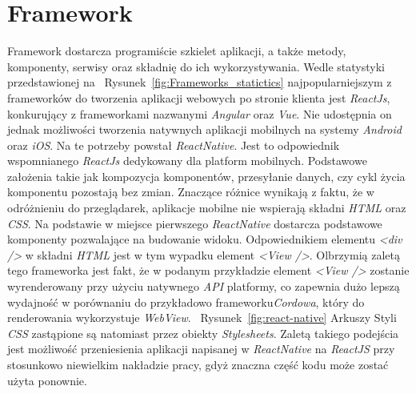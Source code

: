 \documentclass[skorowidz,skroty]{dyplomWEZUT}
\begin{document}
\section{Framework}\label{sec: framework}

Framework dostarcza programiście szkielet aplikacji, a także metody, komponenty, serwisy oraz składnię do ich wykorzystywania. Wedle statystyki przedstawionej na ~Rysunek~\ref{fig:Frameworks_statictics} \cite{FrameworksPopularity} najpopularniejszym z frameworków do tworzenia aplikacji webowych po stronie klienta jest \textit{ReactJs}, konkurujący z frameworkami nazwanymi \textit{Angular} oraz \textit{Vue}. Nie udostępnia on jednak możliwości tworzenia natywnych aplikacji mobilnych na systemy \textit{Android} oraz \textit{iOS}. Na te potrzeby powstał \textit{ReactNative}. Jest to odpowiednik wspomnianego \textit{ReactJs} dedykowany dla platform mobilnych. Podstawowe założenia takie jak kompozycja komponentów, przesyłanie danych, czy cykl życia komponentu pozostają bez zmian. Znaczące różnice wynikają z faktu, że w odróżnieniu do przeglądarek, aplikacje mobilne nie wspierają składni \textit{HTML} oraz \textit{CSS}. Na podstawie \cite{ReactNative} w miejsce pierwszego \textit{ReactNative} dostarcza podstawowe komponenty pozwalające na budowanie widoku. Odpowiednikiem elementu \textit{<div />} w składni \textit{HTML} jest w tym wypadku element \textit{<View />}. Olbrzymią zaletą tego frameworka jest fakt, że w podanym przykładzie element \textit{<View />} zostanie wyrenderowany przy użyciu natywnego \textit{API} platformy, co zapewnia dużo lepszą wydajność w porównaniu do przykładowo frameworku\textit{Cordowa}, który do renderowania wykorzystuje \textit{WebView}. ~Rysunek~\ref{fig:react-native} Arkuszy Styli \textit{CSS} zastąpione są natomiast przez obiekty \textit{Stylesheets}. Zaletą takiego podejścia jest możliwość przeniesienia aplikacji napisanej w \textit{ReactNative} na \textit{ReactJS} przy stosunkowo niewielkim nakładzie pracy, gdyż znaczna część kodu może zostać użyta ponownie. 
\end{document}
